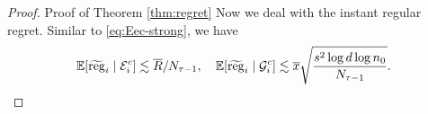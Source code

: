 \begin{proof}{Proof of Theorem \ref{thm:regret}}
Now we deal with the instant regular regret. Similar to \eqref{eq:Eec-strong}, we have 
	\begin{equation}\label{eq:Eec-regular}
	\mathbb{E}[\widetilde{\operatorname{reg}}_i \;|\; {\cal E}_i^c] \lesssim \overline{R}/N_{\tau-1}, \quad \mathbb{E}[\widetilde{\operatorname{reg}}_i \;|\; {\cal G}_i^c] \lesssim \overline{x}\sqrt{\frac{s^2\log d  \log n_0}{N_{\tau-1}}}.
\end{equation}
%


\end{proof}

